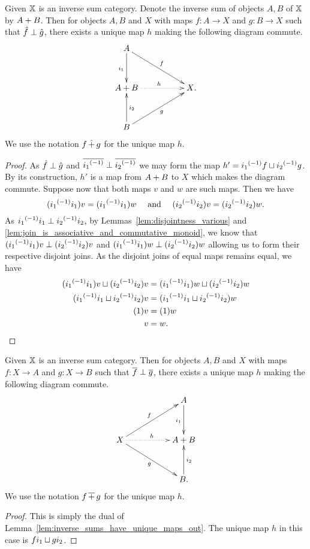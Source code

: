 \begin{lemma}\label{lem:inverse_sums_have_unique_maps_out}
  Given $\mathbb{X}$ is an inverse sum category. Denote the inverse sum of objects $A,B$ of $\mathbb{X}$ by
  ${{A}+{B}}$. Then for objects $A,B$ and $X$ with maps $f:A\to X$ and $g:B\to X$ such that
  $\hat{f} \perp \hat{g}$, there exists a unique map $h$ making the following diagram commute.
  \[
    \xymatrix@R+10pt@C+28pt {
      A \ar[dr]^{f} \ar[d]_{i_1}
        \\
      \invsum{A}{B} \ar@{.>}[r]^{h}
        & X\text{.}\\
      B \ar[ur]_{g} \ar[u]_{i_2}
    }
  \]
  We use the notation $f\operatorname{\hat{+}} g$ for the unique map $h$.
\end{lemma}
\begin{proof}
  As $\hat{f} \perp \hat{g}$ and $\overline{{i_1}^{(-1)}} \perp \overline{{i_2}^{(-1)}}$ we may form the map $h'
  = {i_1}^{(-1)}f \sqcup {i_2}^{(-1)}g$. By its construction, $h'$ is a map from ${{A}+{B}}$ to $X$
  which makes the diagram commute. Suppose now that both maps $v$ and $w$ are such maps. Then we
  have
  \[
    ({i_1}^{(-1)}i_1) v = ({i_1}^{(-1)}i_1) w \quad\text{ and }\quad({i_2}^{(-1)}i_2) v = ({i_2}^{(-1)}i_2) w.
  \]
  As ${i_1}^{(-1)}i_1 \perp {i_2}^{(-1)}i_2$, by Lemmas~\ref{lem:disjointness_various} and
  \ref{lem:join_is_associative_and_commutative_monoid}, we know that $({i_1}^{(-1)}i_1) v \perp
  ({i_2}^{(-1)}i_2) v$ and $({i_1}^{(-1)}i_1) w \perp ({i_2}^{(-1)}i_2) w$ allowing us to form their
  respective disjoint joins. As the disjoint joins of equal maps remains equal, we have
  \begin{align*}
    ({i_1}^{(-1)}i_1) v \sqcup ({i_2}^{(-1)}i_2) v &=     ({i_1}^{(-1)}i_1) w \sqcup ({i_2}^{(-1)}i_2) w \\
    ({i_1}^{(-1)}i_1 \sqcup {i_2}^{(-1)}i_2 )v &=     ({i_1}^{(-1)}i_1 \sqcup {i_2}^{(-1)}i_2) w \\
    (1 )v &=     (1) w \\
        v &=  w.
  \end{align*}
\end{proof}

\begin{corollary}\label{cor:inverse_sums_have_unique_maps_in}
  Given $\mathbb{X}$ is an inverse sum category. Then for objects $A,B$ and $X$ with maps $f:X\to A$
  and $g:X\to B$ such that
  $\overline{f} \perp \overline{g}$, there exists a unique map $h$ making the following diagram commute.
  \[
    \xymatrix@R+10pt@C+28pt {
      &A \ar[d]_{i_1}
        \\
      X   \ar[dr]_{g} \ar[ur]^{f}  \ar@{.>}[r]^{h} & \invsum{A}{B}\\
      & B \ar[u]_{i_2}\text{.}
    }
  \]
  We use the notation $f\operatorname{\overline{+}} g$ for the unique map $h$.
\end{corollary}
\begin{proof}
  This is simply the dual of Lemma~\ref{lem:inverse_sums_have_unique_maps_out}. The unique map $h$
  in this case is $f i_1 \sqcup g i_2$.
\end{proof}

